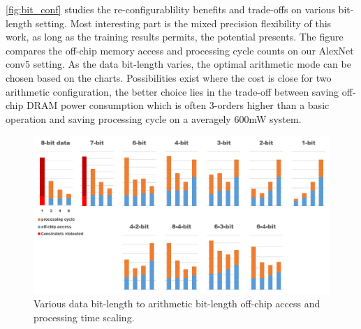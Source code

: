 \begin{table}[h!]
    \caption{TensorRT AlexNet results}
    \label{tab:xnor_result}
    \centering
    \footnotesize 
\end{table}



\autoref{fig:bit_conf} studies the re-configurablility benefits and trade-offs on various bit-length setting. Most interesting part is the mixed precision flexibility of this work, as long as the training results permits, the potential presents. The figure compares the off-chip memory access and processing cycle counts on our AlexNet conv5 setting. As the data bit-length varies, the optimal arithmetic mode can be chosen based on the charts. Possibilities exist where the cost is close for two arithmetic configuration, the better choice lies in the trade-off between saving off-chip DRAM power consumption which is often 3-orders higher than a basic operation and saving processing cycle on a averagely 600mW system.

\begin{figure}[hbt!]
    \centering
    \includegraphics[width=1\linewidth]{inc/5_results/figure/bit_conf.png}
    \caption{Various data bit-length to arithmetic bit-length off-chip access and processing time scaling.}
    \label{fig:bit_conf}
\end{figure}

